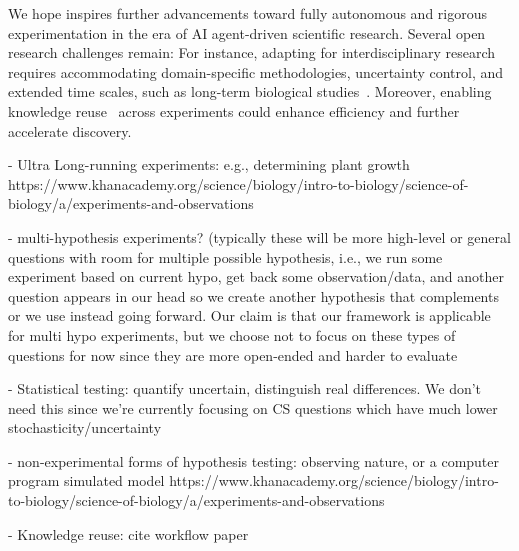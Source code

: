 We hope \sys inspires further advancements toward fully autonomous and rigorous experimentation in the era of AI agent-driven scientific research.
Several open research challenges remain:
For instance, adapting \sys for interdisciplinary research requires accommodating domain-specific methodologies, uncertainty control, and extended time scales, such as long-term biological studies~\cite{plant1}.
Moreover, enabling knowledge reuse~\cite{agentworkflowmemory} across experiments could enhance efficiency and further accelerate discovery.

- Ultra Long-running experiments: e.g., determining plant growth https://www.khanacademy.org/science/biology/intro-to-biology/science-of-biology/a/experiments-and-observations 

- multi-hypothesis experiments? (typically these will be more high-level or general questions with room for multiple possible hypothesis, i.e., we run some experiment based on current hypo, get back some observation/data, and another question appears in our head so we create another hypothesis that complements or we use instead going forward. Our claim is that our framework is applicable for multi hypo experiments, but we choose not to focus on these types of questions for now since they are more open-ended and harder to evaluate 

- Statistical testing: quantify uncertain, distinguish real differences. We don't need this since we're currently focusing on CS questions which have much lower stochasticity/uncertainty

- non-experimental forms of hypothesis testing: observing nature, or a computer program simulated model https://www.khanacademy.org/science/biology/intro-to-biology/science-of-biology/a/experiments-and-observations 

- Knowledge reuse: cite workflow paper 
\fi
